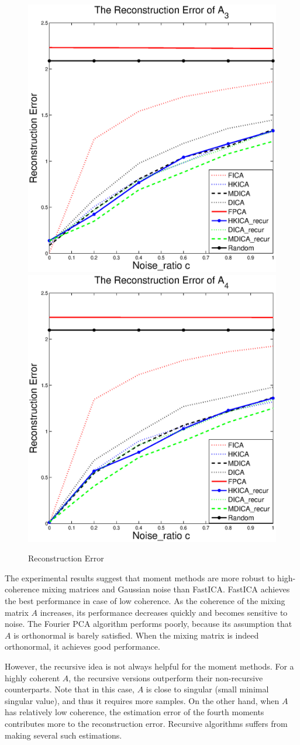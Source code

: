 \documentclass{article}
\theoremstyle{definition}
\begin{document}
\begin{figure}[t]
	\includegraphics[width =0.49\columnwidth]{error3} \medskip \\
	\includegraphics[width =0.49\columnwidth]{error4}
\vspace{-0.5cm}
\caption{
\label{fig:Error}
 Reconstruction Error}
\end{figure}
The experimental results suggest that moment methods are more robust
to high-coherence mixing matrices and Gaussian noise than FastICA.
FastICA achieves the best performance in case of low coherence.
As the coherence of the mixing matrix $A$ increases, its performance decreases quickly and becomes sensitive to noise. 
The Fourier PCA algorithm performs poorly, because its assumption that
$A$ is orthonormal is barely satisfied. 
When the mixing matrix is indeed orthonormal, it achieves good performance.

However, the recursive idea is not always helpful for the moment methods. For a highly coherent $A$, the recursive versions outperform their non-recursive counterparts.
Note that in this case, $A$ is close to singular (small minimal
singular value), and thus it requires more samples.
On the other hand, when $A$ has relatively low coherence,  the estimation error of the fourth moments contributes more to the reconstruction error. 
Recursive algorithms suffers from making several such estimations.
\end{document}
